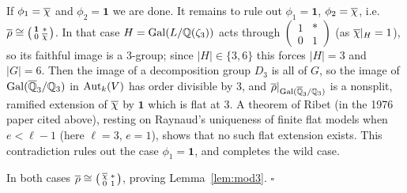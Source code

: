 \documentclass[11pt]{article}
\begin{document}
If $\phi_1=\overline{\chi}$ and $\phi_2=\mathbf1$ we are done. It remains to rule out
$\phi_1=\mathbf1$, $\phi_2=\overline{\chi}$, i.e.\
$\overline{\rho}\cong\left(\begin{smallmatrix}\mathbf1&*\\0&\overline{\chi}\end{smallmatrix}\right)$.
In that case $H=\operatorname{Gal}(L/\mathbb{Q}(\zeta_3))$ acts through
$\left(\begin{smallmatrix}1&*\\0&1\end{smallmatrix}\right)$ (as $\overline{\chi}|_H=1$),
so its faithful image is a $3$-group; since $|H|\in\{3,6\}$ this forces $|H|=3$
and $|G|=6$. Then the image of a decomposition group $D_3$ is all of $G$, so the
image of $\operatorname{Gal}(\overline{\mathbb{Q}}_3/\mathbb{Q}_3)$ in $\operatorname{Aut}_k(V)$ has order divisible by $3$, and
$\overline{\rho}|_{\operatorname{Gal}(\overline{\mathbb{Q}}_3/\mathbb{Q}_3)}$ is a nonsplit, ramified extension of $\overline{\chi}$
by $\mathbf1$ which is flat at $3$. A theorem of Ribet (in the 1976 paper cited
above), resting on Raynaud's uniqueness of finite flat models when $e<\ell-1$
(here $\ell=3$, $e=1$), shows that no such flat extension exists. This
contradiction rules out the case $\phi_1=\mathbf1$, and completes the wild
case.

\medskip
In both cases $\overline{\rho}\cong\left(\begin{smallmatrix}\overline{\chi}&*\\0&1\end{smallmatrix}\right)$,
proving Lemma~\ref{lem:mod3}. \hfill$\square$
\end{document}
